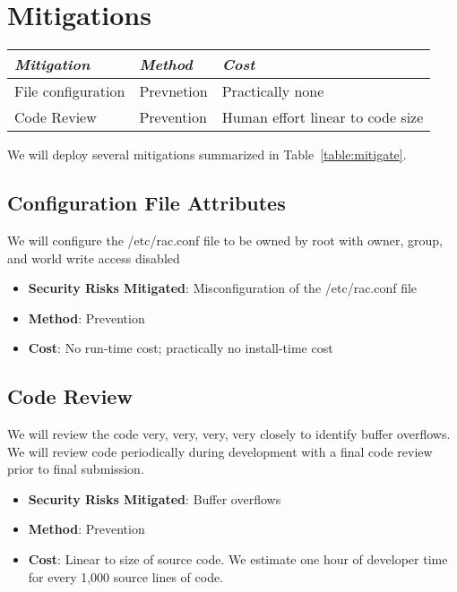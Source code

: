 \section{Mitigations}
\label{section:mitigate}

\begin{table*}[htb]
\begin{center}
\begin{tabular}{|l|l|l|}
\hline
\emph{Mitigation} & \emph{Method} & \emph{Cost} \\
\hline
File configuration & Prevnetion & Practically none \\
\hline
Code Review & Prevention & Human effort linear to code size \\
\hline
\end{tabular}
\caption{Mitigation Summary}
\label{table:mitigate}
\end{center}
\end{table*}

We will deploy several mitigations summarized in Table~\ref{table:mitigate}.

\subsection{Configuration File Attributes}

We will configure the /etc/rac.conf file to be owned by root with
owner, group, and world write access disabled

\begin{itemize}
  \item{\textbf{Security Risks Mitigated}:}
  Misconfiguration of the /etc/rac.conf file

  \item{\textbf{Method}:}
  Prevention

  \item{\textbf{Cost}:}
  No run-time cost; practically no install-time cost
\end{itemize}

\subsection{Code Review}

We will review the code very, very, very, very closely to identify buffer
overflows.  We will review code periodically during development with a final
code review prior to final submission.

\begin{itemize}
  \item{\textbf{Security Risks Mitigated}:}
  Buffer overflows

  \item{\textbf{Method}:}
  Prevention

  \item{\textbf{Cost}:}
  Linear to size of source code.   We estimate one hour of developer time for
  every 1,000 source lines of code.
\end{itemize}
